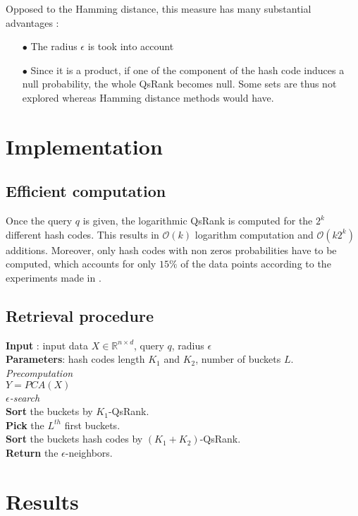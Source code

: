 \documentclass{article}
\newcommand{\RR}{\mathbb{R}}
\begin{document}
Opposed to the Hamming distance, this measure has many substantial advantages :
\begin{enumerate}
	\item[$\bullet$] The radius $\epsilon$ is took into account	
	\item[$\bullet$] Since it is a product, if one of the component of the hash code induces a null probability, the whole QsRank becomes null. Some sets are thus not explored whereas Hamming distance methods would have.
\end{enumerate}

\section{Implementation}

\subsection{Efficient computation}

Once the query $q$ is given, the logarithmic QsRank is computed for the $2^k$ different hash codes. This results in $\mathcal{O}(k)$ logarithm computation and $\mathcal{O}(k 2^k)$ additions. Moreover, only hash codes with non zeros probabilities have to be computed, which accounts for only $15\%$ of the data points according to the experiments made in \citep{QSRank}.

\subsection{Retrieval procedure}

\begin{algorithm}[H]

\textbf{Input} : input data $X \in \RR^{n \times d}$, query $q$, radius $\epsilon$\\
\textbf{Parameters}: hash codes length $K_1$ and $K_2$, number of buckets $L$.\\
\textit{Precomputation}\\
$Y = PCA(X)$\\
\textit{$\epsilon$-search}\\
\textbf{Sort} the buckets by $K_1$-QsRank.\\
\textbf{Pick} the $L^{th}$ first buckets.\\
\textbf{Sort} the buckets hash codes by $(K_1+K_2)$-QsRank.\\
\textbf{Return} the $\epsilon$-neighbors.
\end{algorithm}


\section{Results}

\end{document}
